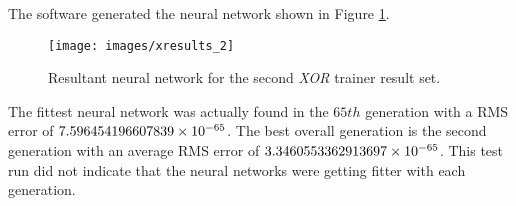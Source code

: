 The software generated the neural network shown in Figure \ref{xresults_2}.

\begin{figure}[htb!]
  \centering
  \texttt{[image: images/xresults\_2]}
  \caption{Resultant neural network for the second {\it XOR} trainer result set.}
  \label{xresults_2}
\end{figure}

The fittest neural network was actually found in the $65{th}$
generation with a RMS error of $7.596454196607839\times 10^{-65}$.
The best overall generation is the second generation with an average
RMS error of $3.3460553362913697\times 10^{-65}$.
This test run did not indicate that the neural networks were getting
fitter with each generation. 
